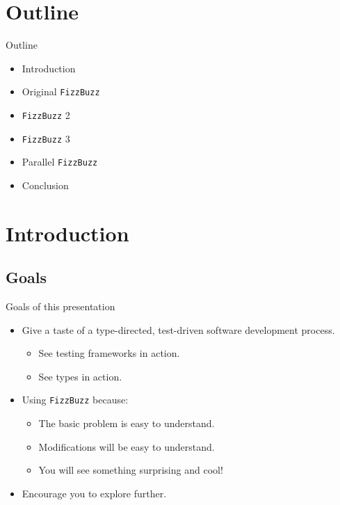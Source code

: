 \section*{Outline}

\begin{frame}{Outline}
  \begin{itemize}
  \item Introduction
  \item Original \texttt{FizzBuzz}
  \item \texttt{FizzBuzz} 2
  \item \texttt{FizzBuzz} 3
  \item Parallel \texttt{FizzBuzz}
  \item Conclusion
  \end{itemize}
\end{frame}



\section{Introduction}

\subsection{Goals}

\begin{frame}{Goals of this presentation}
  \begin{itemize}
  \item Give a taste of a \alert{type}-directed, \alert{test}-driven software development process.
    \begin{itemize}
    \item See testing frameworks in action.
    \item See types in action.
    \end{itemize}
  \item Using \texttt{FizzBuzz} because:
    \begin{itemize}
    \item The basic problem is easy to understand.
    \item Modifications will be easy to understand.
    \item You will see something surprising and cool!
    \end{itemize}
  \item Encourage you to explore further.
  \end{itemize}
\end{frame}

